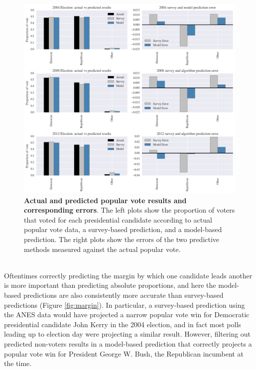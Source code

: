 \documentclass{article}
\begin{document}
	\begin{figure}[h!]
		\begin{center}
			\includegraphics*[width=1\linewidth]{survey_model_error}
			\caption{\textbf{Actual and predicted popular vote results and corresponding errors}. The left plots show the proportion of voters that voted for each presidential candidate according to actual popular vote data, a survey-based prediction, and a model-based prediction. The right plots show the errors of the two predictive methods measured against the actual popular vote.}
			\label{fig:survey_model_error}
		\end{center}
	\end{figure}
	\hfill \\
	Oftentimes correctly predicting the margin by which one candidate leads another is more important than predicting absolute proportions, and here the model-based predictions are also consistently more accurate than survey-based predictions (Figure \ref{fig:margin}). In particular, a survey-based prediction using the ANES data would have projected a narrow popular vote win for Democratic presidential candidate John Kerry in the 2004 election, and in fact most polls leading up to election day were projecting a similar result. However, filtering out predicted non-voters results in a model-based prediction that correctly projects a popular vote win for President George W. Bush, the Republican incumbent at the time.
\end{document}
